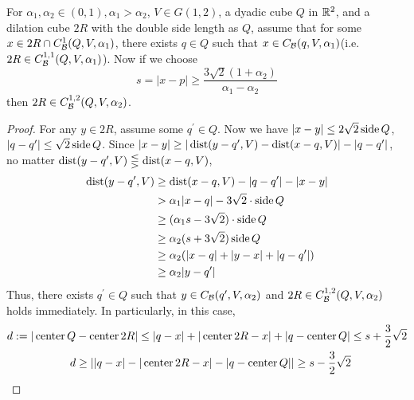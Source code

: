 \begin{lemma}\label{lemma:Guarantee-Distance-contain2R-Between-2alpha}
    For $\alpha_1, \alpha_2\in(0,1), \alpha_1>\alpha_2$, $V\in G(1,2)$, a dyadic cube $Q$ in $\mathbb{R}^2$, and a dilation cube $2R$ with the double side length as $Q$, assume that for some $x\in 2R \cap C_\mathcal B^{1}(Q, V, \alpha_1)$, there exists $q\in Q$ such that $x\in C_\mathcal B(q, V, \alpha_1)$(i.e. $2R\in C_\mathcal B^{1,1}(Q, V, \alpha_1)$). Now if we choose
    \begin{equation}
        s=|x-p| \geq \frac{3\sqrt{2}(1+\alpha_2)}{\alpha_1-\alpha_2}
    \end{equation}
    then $2R\in  C_\mathcal B^{1,2}(Q, V, \alpha_2)$.
\end{lemma}
\begin{proof} 
    For any $y\in 2R$, assume some $q^\prime\in Q$. Now we have $|x-y|\leq 2\sqrt{2}\operatorname{side} Q$, $|q-q^\prime|\leq \sqrt{2}\operatorname{side} Q$. Since $ |x-y| \geq|\operatorname{dist} (y-q^\prime, V)-\operatorname{dist}(x-q, V)| - |q-q^\prime|$, no matter $\operatorname{dist} (y-q^\prime, V)\lesseqgtr\operatorname{dist}(x-q, V)$,
    \begin{equation*}
        \begin{split}
            \operatorname{dist}(y-q^\prime, V) &\geq \operatorname{dist}(x-q, V)-|q-q^\prime|-|x-y| \\
            &> \alpha_1|x-q| - 3\sqrt{2}\cdot \operatorname{side} Q\\
            &\geq (\alpha_1 s- 3\sqrt{2})\cdot\operatorname{side} Q\\
            &\geq \alpha_2(s+3\sqrt{2})\operatorname{side} Q \\
            &\geq \alpha_2(|x-q|+|y-x|+|q-q^\prime|)\\
            &\geq \alpha_2|y-q^\prime|
        \end{split}
    \end{equation*}
    Thus, there exists $q^\prime\in Q$ such that $y\in C_\mathcal B(q^\prime, V, \alpha_2)$ and $2R\in  C_\mathcal B^{1,2}(Q, V, \alpha_2)$ holds immediately. In particularly, in this case, 
    \begin{subequations}
        \begin{align}
            d := |\operatorname{center} Q&-\operatorname{center} 2R| \leq |q-x|+|\operatorname{center} 2R-x|+|q-\operatorname{center} Q|\leq s+\frac{3}{2}\sqrt{2} \\
            d &\geq ||q-x|-|\operatorname{center} 2R-x|-|q-\operatorname{center} Q| |\geq s-\frac{3}{2}\sqrt{2} 
        \end{align}
    \end{subequations}
\end{proof}

